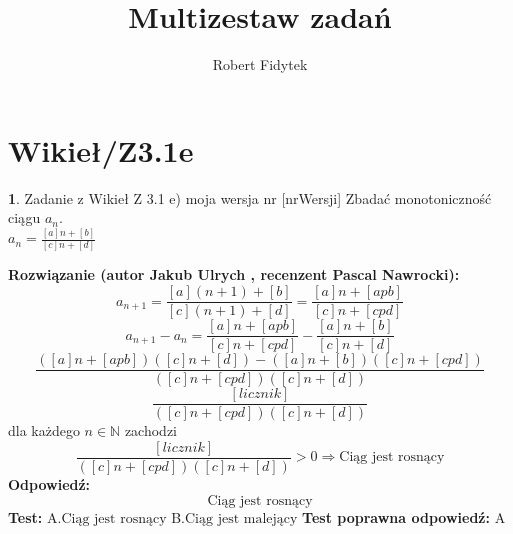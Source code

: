 \documentclass[12pt, a4paper]{article}
\title{Multizestaw zadań}
\author{Robert Fidytek}
\date{}
\theoremstyle{definition} %
\newtheorem{zad}{}
\newcommand{\kategoria}[1]{\section{#1}} %
\newcommand{\zadStart}[1]{\begin{zad}#1\newline} %
\newcommand{\zadStop}{\end{zad}}   %
\newcommand{\rozwStart}[2]{\noindent \textbf{Rozwiązanie (autor #1 , recenzent #2): }\newline} %
\newcommand{\rozwStop}{\newline}                                            %
\newcommand{\odpStart}{\noindent \textbf{Odpowiedź:}\newline}    %
\newcommand{\odpStop}{\newline}                                             %
\newcommand{\testStart}{\noindent \textbf{Test:}\newline} %
\newcommand{\testStop}{\newline} %
\newcommand{\kluczStart}{\noindent \textbf{Test poprawna odpowiedź:}\newline} %
\newcommand{\kluczStop}{\newline} %
\begin{document}
\maketitle


\kategoria{Wikieł/Z3.1e}
\zadStart{Zadanie z Wikieł Z 3.1 e) moja wersja nr [nrWersji]}
Zbadać monotoniczność ciągu $a_{n}$.\\ $a_{n}=\frac{[a]n+[b]}{[c]n+[d]}$
\zadStop
\rozwStart{Jakub Ulrych}{Pascal Nawrocki}
$$a_{n+1}=\frac{[a](n+1)+[b]}{[c](n+1)+[d]}=\frac{[a]n+[apb]}{[c]n+[cpd]}$$
$$a_{n+1}-a_{n}=\frac{[a]n+[apb]}{[c]n+[cpd]}-\frac{[a]n+[b]}{[c]n+[d]}$$
$$\frac{([a]n+[apb])([c]n+[d])-([a]n+[b])([c]n+[cpd])}{([c]n+[cpd])([c]n+[d])}$$
$$\frac{[licznik]}{([c]n+[cpd])([c]n+[d])}$$
dla każdego $n\in\mathbb{N}$ zachodzi
$$\frac{[licznik]}{([c]n+[cpd])([c]n+[d])}>0\Rightarrow \text{Ciąg jest rosnący}$$
\rozwStop
\odpStart
$$\text{Ciąg jest rosnący}$$
\odpStop
\testStart
A.$\text{Ciąg jest rosnący}$
B.$\text{Ciąg jest malejący}$
\testStop
\kluczStart
A
\kluczStop
\end{document}
